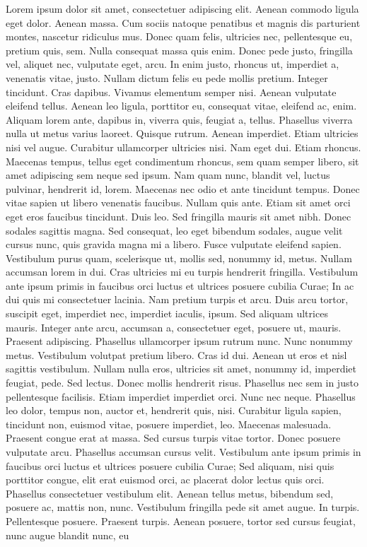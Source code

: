 \documentclass[a4paper, 12pt]{report}
\begin{document}
			\begin{singlespace}
				{\fontsize{12}{14}\selectfont} Lorem ipsum dolor sit amet, consectetuer adipiscing elit. Aenean commodo ligula eget dolor. Aenean massa. Cum sociis natoque penatibus et magnis dis parturient montes, nascetur ridiculus mus. Donec quam felis, ultricies nec, pellentesque eu, pretium quis, sem. Nulla consequat massa quis enim. Donec pede justo, fringilla vel, aliquet nec, vulputate eget, arcu. In enim justo, rhoncus ut, imperdiet a, venenatis vitae, justo. Nullam dictum felis eu pede mollis pretium. Integer tincidunt. Cras dapibus. Vivamus elementum semper nisi. Aenean vulputate eleifend tellus. Aenean leo ligula, porttitor eu, consequat vitae, eleifend ac, enim. Aliquam lorem ante, dapibus in, viverra quis, feugiat a, tellus. Phasellus viverra nulla ut metus varius laoreet. Quisque rutrum. Aenean imperdiet. Etiam ultricies nisi vel augue. Curabitur ullamcorper ultricies nisi. Nam eget dui. Etiam rhoncus. Maecenas tempus, tellus eget condimentum rhoncus, sem quam semper libero, sit amet adipiscing sem neque sed ipsum. Nam quam nunc, blandit vel, luctus pulvinar, hendrerit id, lorem. Maecenas nec odio et ante tincidunt tempus. Donec vitae sapien ut libero venenatis faucibus. Nullam quis ante. Etiam sit amet orci eget eros faucibus tincidunt. Duis leo. Sed fringilla mauris sit amet nibh. Donec sodales sagittis magna. Sed consequat, leo eget bibendum sodales, augue velit cursus nunc, quis gravida magna mi a libero. Fusce vulputate eleifend sapien. Vestibulum purus quam, scelerisque ut, mollis sed, nonummy id, metus. Nullam accumsan lorem in dui. Cras ultricies mi eu turpis hendrerit fringilla. Vestibulum ante ipsum primis in faucibus orci luctus et ultrices posuere cubilia Curae; In ac dui quis mi consectetuer lacinia. Nam pretium turpis et arcu. Duis arcu tortor, suscipit eget, imperdiet nec, imperdiet iaculis, ipsum. Sed aliquam ultrices mauris. Integer ante arcu, accumsan a, consectetuer eget, posuere ut, mauris. Praesent adipiscing. Phasellus ullamcorper ipsum rutrum nunc. Nunc nonummy metus. Vestibulum volutpat pretium libero. Cras id dui. Aenean ut eros et nisl sagittis vestibulum. Nullam nulla eros, ultricies sit amet, nonummy id, imperdiet feugiat, pede. Sed lectus. Donec mollis hendrerit risus. Phasellus nec sem in justo pellentesque facilisis. Etiam imperdiet imperdiet orci. Nunc nec neque. Phasellus leo dolor, tempus non, auctor et, hendrerit quis, nisi. Curabitur ligula sapien, tincidunt non, euismod vitae, posuere imperdiet, leo. Maecenas malesuada. Praesent congue erat at massa. Sed cursus turpis vitae tortor. Donec posuere vulputate arcu. Phasellus accumsan cursus velit. Vestibulum ante ipsum primis in faucibus orci luctus et ultrices posuere cubilia Curae; Sed aliquam, nisi quis porttitor congue, elit erat euismod orci, ac placerat dolor lectus quis orci. Phasellus consectetuer vestibulum elit. Aenean tellus metus, bibendum sed, posuere ac, mattis non, nunc. Vestibulum fringilla pede sit amet augue. In turpis. Pellentesque posuere. Praesent turpis. Aenean posuere, tortor sed cursus feugiat, nunc augue blandit nunc, eu 
\end{singlespace}
\end{document}

